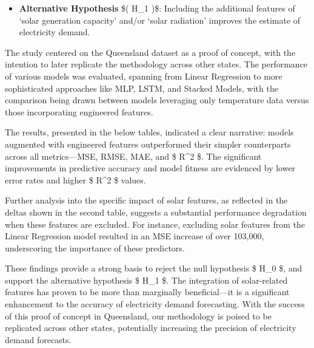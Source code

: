 \documentclass[
]{article}
\providecommand{\tightlist}{%
  \setlength{\itemsep}{0pt}\setlength{\parskip}{0pt}}
\begin{document}
\begin{itemize}
\tightlist
\item
  \textbf{Alternative Hypothesis} \$( H\_1 )\$: Including the additional
  features of `solar generation capacity' and/or `solar radiation'
  improves the estimate of electricity demand.
\end{itemize}

The study centered on the Queensland dataset as a proof of concept, with
the intention to later replicate the methodology across other states.
The performance of various models was evaluated, spanning from Linear
Regression to more sophisticated approaches like MLP, LSTM, and Stacked
Models, with the comparison being drawn between models leveraging only
temperature data versus those incorporating engineered features.

The results, presented in the below tables, indicated a clear narrative:
models augmented with engineered features outperformed their simpler
counterparts across all metrics---MSE, RMSE, MAE, and \$ R\^{}2 \$. The
significant improvements in predictive accuracy and model fitness are
evidenced by lower error rates and higher \$ R\^{}2 \$ values.

Further analysis into the specific impact of solar features, as
reflected in the deltas shown in the second table, suggests a
substantial performance degradation when these features are excluded.
For instance, excluding solar features from the Linear Regression model
resulted in an MSE increase of over 103,000, underscoring the importance
of these predictors.

These findings provide a strong basis to reject the null hypothesis \$
H\_0 \$, and support the alternative hypothesis \$ H\_1 \$. The
integration of solar-related features has proven to be more than
marginally beneficial---it is a significant enhancement to the accuracy
of electricity demand forecasting. With the success of this proof of
concept in Queensland, our methodology is poised to be replicated across
other states, potentially increasing the precision of electricity demand
forecasts.
\end{document}
